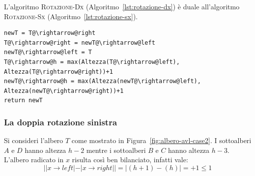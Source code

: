 L'algoritmo \textsc{Rotazione-Dx} (Algoritmo~\ref{lst:rotazione-dx}) è duale all'algoritmo \textsc{Rotazione-Sx} (Algoritmo~\ref{lst:rotazione-sx}).

\begin{lstlisting}[language=asd,caption={Rotazione-Dx(T)},label=lst:rotazione-dx]
newT = T@\rightarrow@right
T@\rightarrow@right = newT@\rightarrow@left
newT@\rightarrow@left = T
T@\rightarrow@h = max(Altezza(T@\rightarrow@left), Altezza(T@\rightarrow@right))+1
newT@\rightarrow@h = max(Altezza(newT@\rightarrow@left), Altezza(newT@\rightarrow@right))+1
return newT
\end{lstlisting}
\subsubsection{La doppia rotazione sinistra}
Si consideri l'albero $T$ come mostrato in Figura~\ref{fig:albero-avl-case2}. I sottoalberi $A$ e $D$ hanno altezza $h-2$ mentre i sottoalberi $B$ e $C$ hanno altezza $h-3$. L'albero radicato in $x$ risulta così ben bilanciato, infatti vale:
\begin{displaymath}
||x \rightarrow left| - |x \rightarrow right|| = |(h+1)-(h)| = +1 \leq 1
\end{displaymath}

